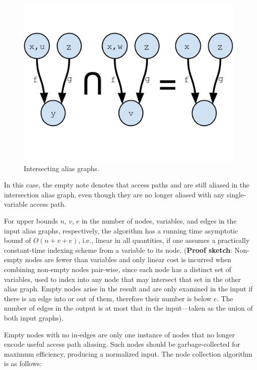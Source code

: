 \begin{figure}[ht]
\centering
\includegraphics[trim={0mm 40mm 0mm 30mm},clip,width=0.9\linewidth]{assets/must-data/intersecting-alias-graphs.pdf}
\caption{Intersecting alias graphs.}
\label{fig:must-data:intersection}
\end{figure}

In this case, the empty note denotes that access paths  and  are still aliased in the intersection alias graph, even though they are no longer aliased with any single-variable access path.

For upper bounds $n$, $v$, $e$ in the number of nodes, variables, and edges in the input alias graphs, respectively, the algorithm has a running time asymptotic bound of $O(n + v + e)$, i.e., linear in all
quantities, if one assumes a practically constant-time indexing scheme from a variable to its node. (\textbf{Proof sketch}: Non-empty nodes are fewer than variables and only linear cost is incurred when combining non-empty nodes pair-wise, since each node has a distinct set of variables, used to index into any node that may intersect that set in the other alias graph. Empty nodes arise in the result and are only examined in the input if there is an edge into or out of them, therefore their number is below $e$. The number of edges in the output is at most that in the input---taken as the union of both input graphs).

Empty nodes with no in-edges are only one instance of nodes that no longer encode useful access path aliasing. Such nodes should be garbage-collected for maximum efficiency, producing a normalized input. The node collection algorithm is as follows:


